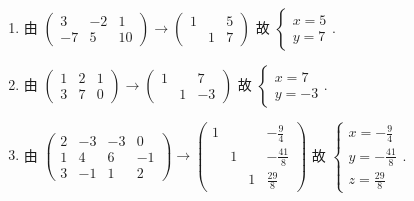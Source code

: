 	\paragraph{} %
		\begin{enumerate}
			\item %
			      由 $\begin{pmatrix}
					      3  & -2 & 1  \\
					      -7 & 5  & 10
				      \end{pmatrix} \to \begin{pmatrix}
					      1 &   & 5 \\
					        & 1 & 7
				      \end{pmatrix}$ 故 $\begin{cases}
					      x=5 \\
					      y=7
				      \end{cases}$.

			\item %
			      由 $\begin{pmatrix}
					      1 & 2 & 1 \\
					      3 & 7 & 0
				      \end{pmatrix} \to \begin{pmatrix}
					      1 &   & 7  \\
					        & 1 & -3
				      \end{pmatrix}$ 故 $\begin{cases}
					      x=7 \\
					      y=-3
				      \end{cases}$.

			\item %
			      由 $\begin{pmatrix}
					      2 & -3 & -3 & 0  \\
					      1 & 4  & 6  & -1 \\
					      3 & -1 & 1  & 2
				      \end{pmatrix} \to \begin{pmatrix}
					      1 &   &   & -\frac{9}{4}  \\
					        & 1 &   & -\frac{41}{8} \\
					        &   & 1 & \frac{29}{8}
				      \end{pmatrix}$ 故 $\begin{cases}
					      x=-\frac{9}{4}  \\
					      y=-\frac{41}{8} \\
					      z=\frac{29}{8}
				      \end{cases}$.


\end{enumerate}
